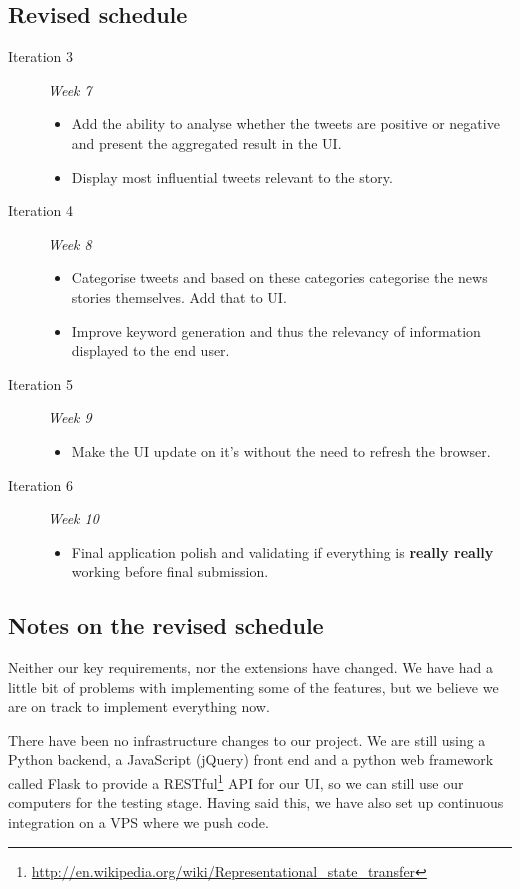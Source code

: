 \documentclass[a4paper,12pt]{article}
\begin{document}
	\subsection{Revised schedule}
	\begin{description}
   \item[Iteration 3] \emph{Week 7}
   \begin{itemize}
     \item Add the ability to analyse whether the tweets are positive or negative and present the aggregated result in the UI.
     \item Display most influential tweets relevant to the story.
   \end{itemize}
   \item[Iteration 4] \emph{Week 8}
   \begin{itemize}
     \item Categorise tweets and based on these categories categorise the news stories themselves. Add that to UI.
     \item Improve keyword generation and thus the relevancy of information displayed to the end user.
   \end{itemize}
   \item[Iteration 5] \emph{Week 9}
   \begin{itemize}
     \item Make the UI update on it's without the need to refresh the browser.
   \end{itemize}
   \item[Iteration 6] \emph{Week 10}
   \begin{itemize}
     \item Final application polish and validating if everything is \textbf{really really} working before final submission.
   \end{itemize}
  \end{description}
  
  \subsection{Notes on the revised schedule}
	
	Neither our key requirements, nor the extensions have changed. We have had a little bit of problems with implementing some of the features, but we believe we are on track to implement everything now.
  
  There have been no infrastructure changes to our project. We are still using a Python backend, a JavaScript (jQuery) front end and a python web framework called Flask to provide a RESTful\footnote{\url{http://en.wikipedia.org/wiki/Representational_state_transfer}} API for our UI, so we can still use our computers for the testing stage. Having said this, we have also set up continuous integration on a VPS where we push code.
\end{document}
